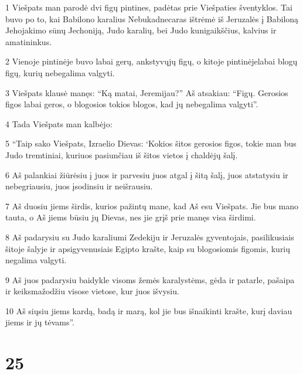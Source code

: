\par 1 Viešpats man parodė dvi figų pintines, padėtas prie Viešpaties šventyklos. Tai buvo po to, kai Babilono karalius Nebukadnecaras ištrėmė iš Jeruzalės į Babiloną Jehojakimo sūnų Jechoniją, Judo karalių, bei Judo kunigaikščius, kalvius ir amatininkus. 
\par 2 Vienoje pintinėje buvo labai gerų, ankstyvųjų figų, o kitoje pintinėje­labai blogų figų, kurių nebegalima valgyti. 
\par 3 Viešpats klausė manęs: “Ką matai, Jeremijau?” Aš atsakiau: “Figų. Gerosios figos labai geros, o blogosios tokios blogos, kad jų nebegalima valgyti”. 
\par 4 Tada Viešpats man kalbėjo: 
\par 5 “Taip sako Viešpats, Izraelio Dievas: ‘Kokios šitos gerosios figos, tokie man bus Judo tremtiniai, kuriuos pasiunčiau iš šitos vietos į chaldėjų šalį. 
\par 6 Aš palankiai žiūrėsiu į juos ir parvesiu juos atgal į šitą šalį, juos atstatysiu ir nebegriausiu, juos įsodinsiu ir neišrausiu. 
\par 7 Aš duosiu jiems širdis, kurios pažintų mane, kad Aš esu Viešpats. Jie bus mano tauta, o Aš jiems būsiu jų Dievas, nes jie grįš prie manęs visa širdimi. 
\par 8 Aš padarysiu su Judo karaliumi Zedekiju ir Jeruzalės gyventojais, pasilikusiais šitoje šalyje ir apsigyvenusiais Egipto krašte, kaip su blogosiomis figomis, kurių negalima valgyti. 
\par 9 Aš juos padarysiu baidykle visoms žemės karalystėms, gėda ir patarle, pašaipa ir keiksmažodžiu visose vietose, kur juos išvysiu. 
\par 10 Aš siųsiu jiems kardą, badą ir marą, kol jie bus išnaikinti krašte, kurį daviau jiems ir jų tėvams”.



\chapter{25}


